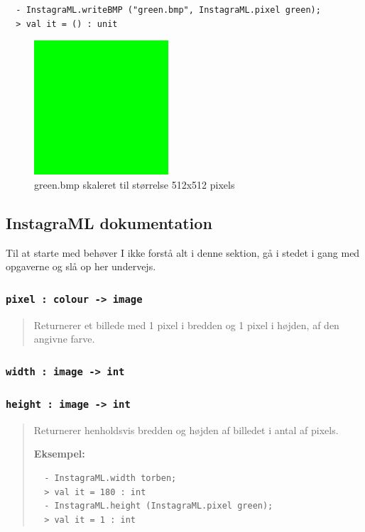 \documentclass[a4paper,12pt]{article}
\begin{document}
\begin{lstlisting}
  - InstagraML.writeBMP ("green.bmp", InstagraML.pixel green);
  > val it = () : unit
\end{lstlisting}
\begin{figure}[h!]
  \centering
  \includegraphics[width=5cm]{uge3_green.png}

  \caption{green.bmp skaleret til størrelse 512x512 pixels}
\label{fig:green}
\end{figure}


\newpage
\subsection{InstagraML dokumentation}
Til at starte med behøver I ikke forstå alt i denne sektion, gå i
stedet i gang med opgaverne og slå op her undervejs.
\subsubsection*{\texttt{pixel : colour -> image}}
\begin{quotation}
\noindent
Returnerer et billede med 1 pixel i bredden og 1 pixel i højden, af
den angivne farve.
\end{quotation}

\subsubsection*{\texttt{width : image -> int} }\vspace{-5mm}
\subsubsection*{\texttt{height : image -> int}}
\begin{quotation}
\noindent
Returnerer henholdsvis bredden og højden af billedet i antal af pixels.

\vspace{1em}
\noindent
\textbf{Eksempel:}
\begin{lstlisting}
  - InstagraML.width torben;
  > val it = 180 : int
  - InstagraML.height (InstagraML.pixel green);
  > val it = 1 : int
\end{lstlisting}
\end{quotation}
\end{document}
